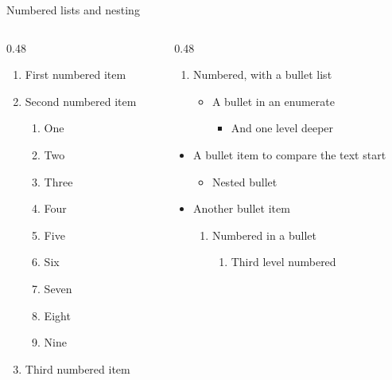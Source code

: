 \begin{standardframe}{Numbered lists and nesting}
	\begin{columns}[T,onlytextwidth]
		\begin{column}{0.48\linewidth}
			\begin{enumerate}
				\item First numbered item
				\item Second numbered item
				\begin{enumerate}
					\item One
					\item Two
					\item Three
					\item Four
					\item Five
					\item Six
					\item Seven
					\item Eight
					\item Nine
				\end{enumerate}
				\item Third numbered item
			\end{enumerate}
		\end{column}
		\begin{column}{0.48\linewidth}
			\begin{enumerate}
				\item Numbered, with a bullet list
				\begin{itemize}
					\item A bullet in an enumerate
					\begin{itemize}
						\item And one level deeper
					\end{itemize}
				\end{itemize}
			\end{enumerate}
			\begin{itemize}
				\item A bullet item to compare the text start
				\begin{itemize}
					\item Nested bullet
				\end{itemize}
				\item Another bullet item
				\begin{enumerate}
					\item Numbered in a bullet
					\begin{enumerate}
						\item Third level numbered
					\end{enumerate}
				\end{enumerate}
			\end{itemize}
		\end{column}
	\end{columns}
\end{standardframe}
